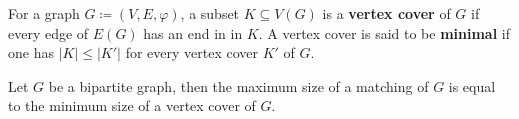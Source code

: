 \begin{definition}
	For a graph \(G \coloneqq (V, E, \varphi)\), a subset \(K \subseteq V(G)\) is a \textbf{vertex cover} of \(G\) if every edge of \(E(G)\) has an end in in \(K\). 
	A vertex cover is said to be \textbf{minimal} if one has \(|K| \leq |K'|\) for every vertex cover \(K'\) of \(G\).
\end{definition}

\begin{theorem}
	Let \(G\) be a bipartite graph, then the maximum size of a matching of \(G\) is equal to the minimum size of a vertex cover of \(G\).
\end{theorem}



